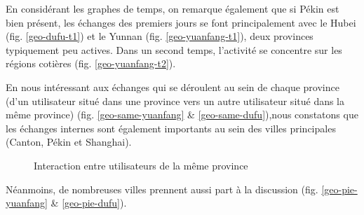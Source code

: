 En considérant les graphes de temps, on remarque également que si Pékin est bien présent, les échanges des premiers jours se font principalement avec le Hubei (fig. \ref{geo-dufu-t1}) et le Yunnan (fig. \ref{geo-yuanfang-t1}), deux provinces typiquement peu actives. Dans un second temps, l'activité se concentre sur les régions cotières (fig. \ref{geo-yuanfang-t2}).

En nous intéressant aux échanges qui se déroulent au sein de chaque province (d{\textquoteright}un utilisateur situé dans une province vers un autre utilisateur situé dans la même province) (fig. \ref{geo-same-yuanfang} \& \ref{geo-same-dufu}),nous constatons que les échanges internes sont également importants au sein des villes principales (Canton, Pékin et Shanghai).

\begin{figure}[htbp]
    \centering
    \caption{
        Interaction entre utilisateurs de la même province
    }
\end{figure}

Néanmoins, de nombreuses villes prennent aussi part \`a la discussion (fig. \ref{geo-pie-yuanfang} \& \ref{geo-pie-dufu}). 


